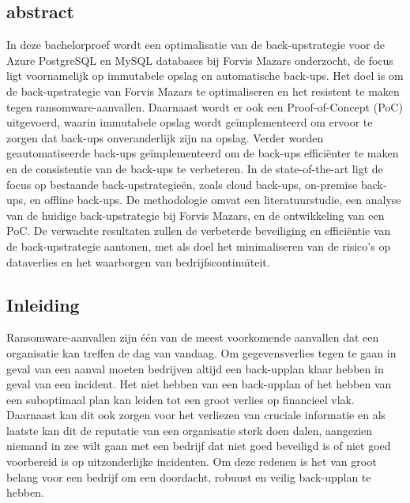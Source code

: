 \subsection{abstract}
In deze bachelorproef wordt een optimalisatie van de back-upstrategie voor de Azure PostgreSQL en MySQL databases bij Forvis Mazars onderzocht, de focus ligt voornamelijk op immutabele opslag en automatische back-ups. Het doel is om de back-upstrategie van Forvis Mazars te optimaliseren en het resistent te maken tegen ransomware-aanvallen. Daarnaast wordt er ook een Proof-of-Concept (PoC) uitgevoerd, waarin immutabele opslag wordt geïmplementeerd om ervoor te zorgen dat back-ups onveranderlijk zijn na opslag. Verder worden geautomatiseerde back-ups geïmplementeerd om de back-ups efficiënter te maken en de consistentie van de back-ups te verbeteren. In de state-of-the-art ligt de focus op bestaande back-upstrategieën, zoals cloud back-ups, on-premise back-ups, en offline back-ups.   De methodologie omvat een literatuurstudie, een analyse van de huidige back-upstrategie bij Forvis Mazars, en de ontwikkeling van een PoC. De verwachte resultaten zullen de verbeterde beveiliging en efficiëntie van de back-upstrategie aantonen, met als doel het minimaliseren van de risico's op dataverlies en het waarborgen van bedrijfscontinuïteit.

\tableofcontents


\subsection{Inleiding}%
\label{sec:inleiding}
Ransomware-aanvallen zijn één van de meest voorkomende aanvallen dat een organisatie kan treffen de dag van vandaag. Om gegevensverlies tegen te gaan in geval van een aanval moeten bedrijven altijd een back-upplan klaar hebben in geval van een incident. Het niet hebben van een back-upplan of het hebben van een suboptimaal plan kan leiden tot een groot verlies op financieel vlak. Daarnaast kan dit ook zorgen voor het verliezen van cruciale informatie en als laatste kan dit de reputatie van een organisatie sterk doen dalen, aangezien niemand in zee wilt gaan met een bedrijf dat niet goed beveiligd is of niet goed voorbereid is op uitzonderlijke incidenten. Om deze redenen is het van groot belang voor een bedrijf om een doordacht, robuust en veilig back-upplan te hebben.

